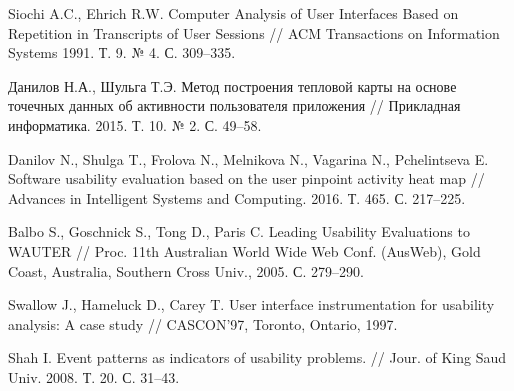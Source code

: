 
\begin{thebibliography}{1}
	Siochi A.C., Ehrich R.W.
	Computer Analysis of User Interfaces Based on Repetition in Transcripts of User Sessions
	// ACM Transactions on Information Systems 1991. Т. 9. № 4. С. 309–335.
	
	Данилов Н.А., Шульга Т.Э.
	Метод построения тепловой карты на основе точечных данных об активности пользователя приложения
	// Прикладная информатика. 2015. Т. 10. № 2.
	С. 49–58.
	
	Danilov N., Shulga T., Frolova N., Melnikova N., Vagarina N., Pchelintseva E.
	Software usability evaluation based on the user pinpoint activity heat map
	// Advances in Intelligent Systems and Computing. 2016. Т. 465. С. 217–225.
	
	Balbo S., Goschnick S., Tong D., Paris C.
	Leading Usability Evaluations to WAUTER
	// Proc. 11th Australian World Wide Web Conf. (AusWeb), Gold Coast, Australia, Southern Cross Univ., 2005. С. 279–290.
	
	Swallow J., Hameluck D., Carey T.
	User interface instrumentation for usability analysis: A case study
	// CASCON’97, Toronto, Ontario, 1997.
	
	Shah I.
	Event patterns as indicators of usability problems.
	// Jour. of King Saud Univ. 2008. Т. 20. С. 31–43.
	
\end{thebibliography}

